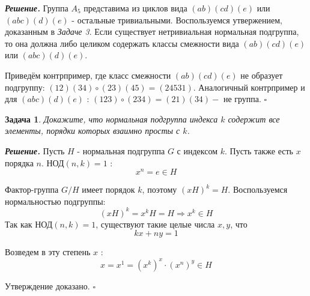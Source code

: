 \documentclass[12pt]{article}
\newtheorem{problem}{Задача}
\newenvironment{solution}[1][\it{Решение}]{\textbf{#1. } }{$\square$}
\begin{document}
\begin{solution}
    Группа $A_5$ представима из циклов вида $(ab)(cd)(e)$  или $(abc)(d)(e)$ - остальные тривиальными.
    Воспользуемся утвержением, доказанным в \textit{Задаче 3}. Если существует нетривиальная нормальная подгруппа, то она должна либо целиком содержать классы смежности вида $(ab)(cd)(e)$  или $(abc)(d)(e)$.


    Приведём контрпример, где класс смежности $(ab)(cd)(e)$ не образует подгруппу: $(12)(34) \circ (23)(45)=(24531)$. Аналогичный контрпример и для $(abc)(d)(e)$ : $(123) \circ (234)=(21)(34)-$ не группа.
\end{solution}
\begin{problem}
    Докажите, что нормальная подгруппа индекса $k$ содержит все элементы, порядки которых взаимно просты с $k$.
\end{problem}

\begin{solution}
    Пусть $H$ - нормальная подгруппа $G$ с индексом $k$. Пусть  также есть $x$ порядка $n$. НОД$(n, k)=1$ :
    $$
    x^n=e \in H
    $$
    
    Фактор-группа $G / H$ имеет порядок $k$, поэтому $(x H)^k=H$. Воспользуемся нормальностью подгруппы:
    $$
    (x H)^k=x^kH=H \Longrightarrow x^k \in H
    $$
    Так как НОД$(n, k)=1$, существуют такие целые числа $x, y$, что
    $$
    k x+n y=1
    $$
    
    Возведем в эту степень $x$ :
    $$
    x=x^1=\left(x^k\right)^x \cdot\left(x^n\right)^y \in H
    $$
    
    Утверждение доказано.
\end{solution}
\end{document}
